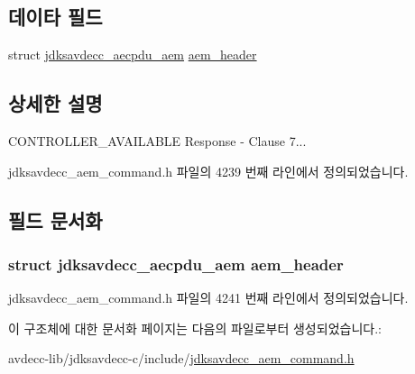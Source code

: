 \subsection*{데이타 필드}
\begin{DoxyCompactItemize}
\item 
struct \hyperlink{structjdksavdecc__aecpdu__aem}{jdksavdecc\+\_\+aecpdu\+\_\+aem} \hyperlink{structjdksavdecc__aem__command__controller__available__response_ae1e77ccb75ff5021ad923221eab38294}{aem\+\_\+header}
\end{DoxyCompactItemize}


\subsection{상세한 설명}
C\+O\+N\+T\+R\+O\+L\+L\+E\+R\+\_\+\+A\+V\+A\+I\+L\+A\+B\+LE Response -\/ Clause 7... 

jdksavdecc\+\_\+aem\+\_\+command.\+h 파일의 4239 번째 라인에서 정의되었습니다.



\subsection{필드 문서화}
\subsubsection[{\texorpdfstring{aem\+\_\+header}{aem_header}}]{\setlength{\rightskip}{0pt plus 5cm}struct {\bf jdksavdecc\+\_\+aecpdu\+\_\+aem} aem\+\_\+header}\hypertarget{structjdksavdecc__aem__command__controller__available__response_ae1e77ccb75ff5021ad923221eab38294}{}\label{structjdksavdecc__aem__command__controller__available__response_ae1e77ccb75ff5021ad923221eab38294}


jdksavdecc\+\_\+aem\+\_\+command.\+h 파일의 4241 번째 라인에서 정의되었습니다.



이 구조체에 대한 문서화 페이지는 다음의 파일로부터 생성되었습니다.\+:\begin{DoxyCompactItemize}
\item 
avdecc-\/lib/jdksavdecc-\/c/include/\hyperlink{jdksavdecc__aem__command_8h}{jdksavdecc\+\_\+aem\+\_\+command.\+h}\end{DoxyCompactItemize}
